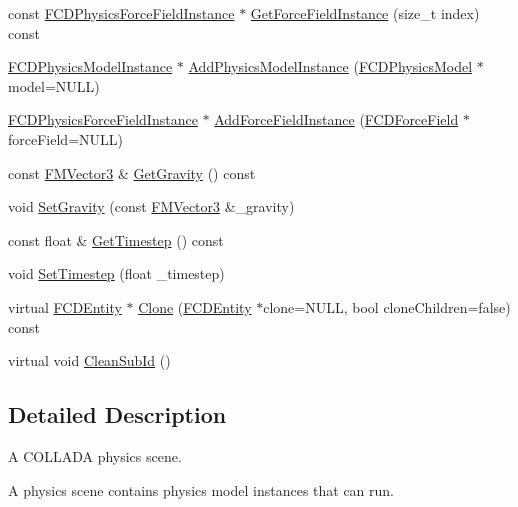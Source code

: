 \begin{DoxyCompactItemize}
\item 
const \hyperlink{classFCDPhysicsForceFieldInstance}{FCDPhysicsForceFieldInstance} $\ast$ \hyperlink{classFCDPhysicsScene_a5a3c11abe31df2e40d93453b0fdf742e}{GetForceFieldInstance} (size\_\-t index) const 
\item 
\hyperlink{classFCDPhysicsModelInstance}{FCDPhysicsModelInstance} $\ast$ \hyperlink{classFCDPhysicsScene_a0286f0990997828c009756e958cc2270}{AddPhysicsModelInstance} (\hyperlink{classFCDPhysicsModel}{FCDPhysicsModel} $\ast$model=NULL)
\item 
\hyperlink{classFCDPhysicsForceFieldInstance}{FCDPhysicsForceFieldInstance} $\ast$ \hyperlink{classFCDPhysicsScene_a79127c7b03493c9ebd3aa68f7facae09}{AddForceFieldInstance} (\hyperlink{classFCDForceField}{FCDForceField} $\ast$forceField=NULL)
\item 
const \hyperlink{classFMVector3}{FMVector3} \& \hyperlink{classFCDPhysicsScene_ad847e934ddc8731ab46b666fd4b0d5de}{GetGravity} () const 
\item 
void \hyperlink{classFCDPhysicsScene_a37ae2125e0c7150f8672e440842355a6}{SetGravity} (const \hyperlink{classFMVector3}{FMVector3} \&\_\-gravity)
\item 
const float \& \hyperlink{classFCDPhysicsScene_a6a845dbcf597cc2ba4c2b6a7c789e88d}{GetTimestep} () const 
\item 
void \hyperlink{classFCDPhysicsScene_ad3a227a5098d99e5257727efd9b30b8e}{SetTimestep} (float \_\-timestep)
\item 
virtual \hyperlink{classFCDEntity}{FCDEntity} $\ast$ \hyperlink{classFCDPhysicsScene_a59f5db89c0c2d3c0da6fea94534c58a1}{Clone} (\hyperlink{classFCDEntity}{FCDEntity} $\ast$clone=NULL, bool cloneChildren=false) const 
\item 
virtual void \hyperlink{classFCDPhysicsScene_a0726265db04f963535a45c1e990256be}{CleanSubId} ()
\end{DoxyCompactItemize}


\subsection{Detailed Description}
A COLLADA physics scene.

A physics scene contains physics model instances that can run. 

